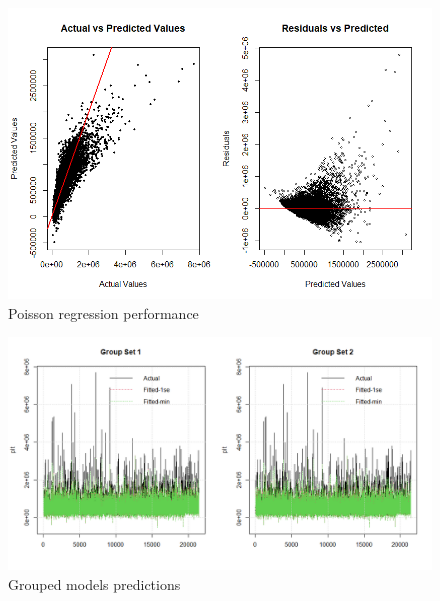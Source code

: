 \documentclass[a4paper, 11pt]{article}
\begin{document}
\begin{figure}[H]
\includegraphics[scale=0.65]{MGLMperf}
\centering
\caption{Poisson regression performance}
\label{fig:MGLMperf}
\end{figure}


\begin{figure}[H]
\includegraphics[scale=0.5]{gglassopred}
\centering
\caption{Grouped models predictions}
\label{fig:gglassopred}
\end{figure}
\end{document}
